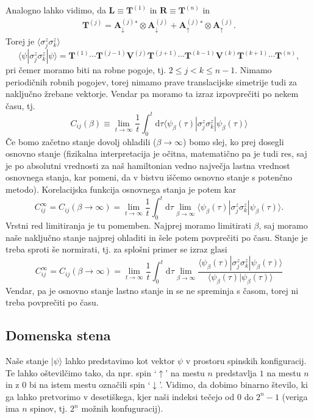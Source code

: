\documentclass[12pt, a4 paper]{article}
\renewcommand{\d}{
	\ensuremath{\mathrm{d}}
}
\begin{document}
Analogno lahko vidimo, da $\mathbf{L} \equiv \mathbf{T}^{(1)}$ in $\mathbf{R} \equiv \mathbf{T}^{(n)}$ in
\begin{align}
	\mathbf{T}^{(j)} = \mathbf{A}^{(j)}_\downarrow{}^* \otimes \mathbf{A}^{(j)}_\downarrow +
		\mathbf{A}^{(j)}_\uparrow{}^* \otimes \mathbf{A}^{(j)}_\uparrow .
\end{align}
Torej je $\langle \sigma^z_j \sigma^z_k \rangle$
\[
	\langle \psi |\sigma^z_j \sigma^z_k | \psi\rangle = \mathbf{T}^{(1)} \cdots \mathbf{T}^{(j-1)} \mathbf{V}^{(j)}
		\mathbf{T}^{(j+1)} \cdots \mathbf{T}^{(k-1)} \mathbf{V}^{(k)} \mathbf{T}^{(k+1)}\cdots \mathbf{T}^{(n)},
\]
pri \v cemer moramo biti na robne pogoje, tj. $2 \leq j < k \leq n-1$. Nimamo periodi\v cnih robnih pogojev, torej nimamo
prave translacijske simetrije tudi za naklju\v cno \v zrebane vektorje. Vendar pa moramo ta izraz izpovpre\v citi po
nekem \v casu, tj.
\[
	C_{ij}(\beta) \equiv \lim_{t \to \infty} \frac{1}{t}\int_0^t \d \tau \langle \psi_\beta(\tau)|\sigma_j^z\sigma_k^z
		|\psi_\beta(\tau)\rangle
\]
\v Ce bomo za\v cetno stanje dovolj ohladili ($\beta \to \infty$) bomo slej, ko prej dosegli osnovno stanje (fizikalna
interpretacija je o\v citna, matemati\v cno pa je tudi res, saj je po absolutni vrednosti za na\v s hamiltonian vedno
najve\v cja lastna vrednost osnovnega stanja, kar pomeni, da v bistvu i\v s\v cemo osnovno stanje s poten\v cno metodo).
Korelacijska funkcija osnovnega stanja je potem kar
\[
	C_{ij}^\infty = C_{ij}(\beta \to \infty) = \lim_{t \to \infty} \frac{1}{t} \int_0^t \d\tau \lim_{\beta \to \infty}
		\langle\psi_\beta(\tau)|\sigma_j^z\sigma_k^z|\psi_\beta(\tau)\rangle.
\]
Vrstni red limitiranja je tu pomemben. Najprej moramo limitirati $\beta$, saj moramo na\v se naklju\v cno stanje najprej
ohladiti in \v sele potem povpre\v citi po \v casu. Stanje je treba sproti \v se normirati, tj. za splo\v sni primer se izraz
glasi
\begin{equation}
	C_{ij}^\infty = C_{ij}(\beta \to \infty) = \lim_{t \to \infty}\frac{1}{t}\int_0^t \d\tau \lim_{\beta \to \infty}
		\frac{\langle\psi_\beta(\tau)|\sigma^z_j\sigma^z_k|\psi_\beta(\tau)\rangle}
		{\langle\psi_\beta(\tau)|\psi_\beta(\tau)\rangle}
\end{equation}
Vendar, pa je osnovno stanje lastno stanje in se ne spreminja s \v casom, torej ni treba povpre\v citi po \v casu.

\subsection{Domenska stena}
Na\v se stanje $|\psi\rangle$ lahko predstavimo kot vektor $\psi$ v prostoru spinskih konfiguracij. Te lahko o\v stevil\v cimo
tako, da npr. spin `$\uparrow$' na mestu $n$ predstavlja $1$ na mestu $n$ in z $0$ bi na istem mestu ozna\v cili spin
`$\downarrow$'. Vidimo, da dobimo binarno \v stevilo, ki ga lahko pretvorimo v deseti\v skega, kjer na\v si indeksi te\v cejo
od $0$ do $2^n-1$ (veriga ima $n$ spinov, tj. $2^n$ mo\v znih konfuguracij).
\end{document}
